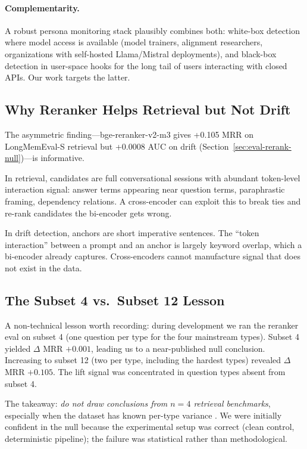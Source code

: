 \paragraph{Complementarity.} A robust persona monitoring stack
plausibly combines both: white-box detection where model access
is available (model trainers, alignment researchers, organizations
with self-hosted Llama/Mistral deployments), and black-box
detection in user-space hooks for the long tail of users
interacting with closed APIs. Our work targets the latter.

\subsection{Why Reranker Helps Retrieval but Not Drift}
\label{sec:discussion-rerank}

The asymmetric finding---bge-reranker-v2-m3 gives +0.105 MRR on
LongMemEval-S retrieval but +0.0008 AUC on drift
(Section~\ref{sec:eval-rerank-null})---is informative.

In retrieval, candidates are full conversational sessions with
abundant token-level interaction signal: answer terms appearing
near question terms, paraphrastic framing, dependency relations.
A cross-encoder can exploit this to break ties and re-rank
candidates the bi-encoder gets wrong.

In drift detection, anchors are short imperative sentences. The
``token interaction'' between a prompt and an anchor is largely
keyword overlap, which a bi-encoder already captures.
Cross-encoders cannot manufacture signal that does not exist in
the data.

\subsection{The Subset 4 vs.\ Subset 12 Lesson}
\label{sec:discussion-subset}

A non-technical lesson worth recording: during development we ran
the reranker eval on subset 4 (one question per type for the four
mainstream types). Subset 4 yielded $\Delta$ MRR $+0.001$, leading
us to a near-published null conclusion. Increasing to subset 12
(two per type, including the hardest types) revealed
$\Delta$ MRR $+0.105$. The lift signal was concentrated in
question types absent from subset 4.

The takeaway: \emph{do not draw conclusions from $n=4$ retrieval
benchmarks}, especially when the dataset has known per-type variance
\citep{longmemeval2024}. We were initially confident in the null
because the experimental setup was correct (clean control,
deterministic pipeline); the failure was statistical rather than
methodological.

